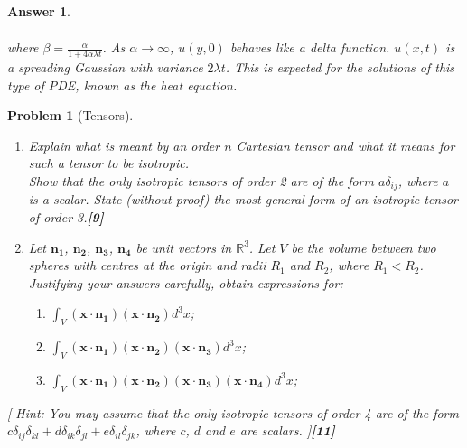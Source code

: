 \documentclass[a4paper]{article}
\newtheorem{ans}{Answer}[section]
\theoremstyle{new}
\newtheorem{qns}{Problem}[section]
\begin{document}
\begin{ans}
\begin{enumerate}[label=(\alph*)]
\begin{align}
\end{align}
where $\beta=\frac{\alpha}{1+4\alpha\lambda t}$. As $\alpha\rightarrow\infty$, $u(y,0)$ behaves like a delta function. $u(x,t)$ is a spreading Gaussian with variance $2\lambda t$. This is expected for the solutions of this type of PDE, known as the heat equation.
\end{enumerate}
\end{ans}
\newpage
\begin{qns}[Tensors]\leavevmode
\begin{enumerate}[label=(\alph*)]
\item Explain what is meant by an order $n$ Cartesian tensor and what it means for such a tensor to be isotropic.\\[5pt]
Show that the only isotropic tensors of order 2 are of the form $a\delta_{ij}$, where $a$ is a scalar. State (without proof) the most general form of an isotropic tensor of order 3.\hfill\textbf{[9]}
\item Let $\mathbf{n_1}$, $\mathbf{n_2}$, $\mathbf{n_3}$, $\mathbf{n_4}$ be unit vectors in $\mathbb{R}^3$. Let $V$ be the volume between two spheres with centres at the origin and radii $R_1$ and $R_2$, where $R_1 < R_2$.\\[5pt]
Justifying your answers carefully, obtain expressions for:
\begin{enumerate}[label=(\roman*)]
    \item $\int_V(\mathbf{x}\cdot\mathbf{n_1})(\mathbf{x}\cdot\mathbf{n_2})d^3x$;
    \item $\int_V(\mathbf{x}\cdot\mathbf{n_1})(\mathbf{x}\cdot\mathbf{n_2})(\mathbf{x}\cdot\mathbf{n_3})d^3x$;
    \item $\int_V(\mathbf{x}\cdot\mathbf{n_1})(\mathbf{x}\cdot\mathbf{n_2})(\mathbf{x}\cdot\mathbf{n_3})(\mathbf{x}\cdot\mathbf{n_4})d^3x$;
\end{enumerate}
\end{enumerate}
[ Hint: You may assume that the only isotropic tensors of order 4 are of the form $c\delta_{ij}\delta_{kl}+d\delta_{ik}\delta_{jl}+e\delta_{il}\delta_{jk}$, where $c$, $d$ and $e$ are scalars. ]\hfill\textbf{[11]}
\end{qns}
\end{document}

